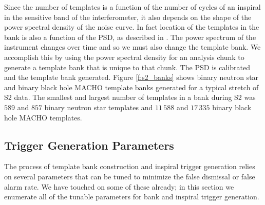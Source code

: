 Since the number of templates is a function of the number of cycles of an
inspiral in the sensitive band of the interferometer, it also depends on the
shape of the power spectral density of the noise curve. In fact location of
the templates in the bank is also a function of the PSD, as described in
\cite{Owen:1998dk}. The power spectrum of the instrument changes over time and
so we must also change the template bank. We accomplish this by using the
power spectral density for an analysis chunk to generate a template bank that
is unique to that chunk. The PSD is calibrated and the template bank
generated. Figure \ref{f:s2_banks} shows binary neutron star and binary
black hole MACHO template banks generated for a typical stretch of S2 data.
The smallest and largest number of templates in a bank during S2 was $589$ and
$857$ binary neutron star templates and $11\,588$ and $17\,335$ binary black
hole MACHO templates.

\subsection{Trigger Generation Parameters}
\label{ss:triggerparameters}

The process of template bank construction and inspiral trigger generation
relies on several parameters that can be tuned to minimize the false dismissal
or false alarm rate. We have touched on some of these already; in this section
we enumerate all of the tunable parameters for bank and inspiral trigger
generation.

